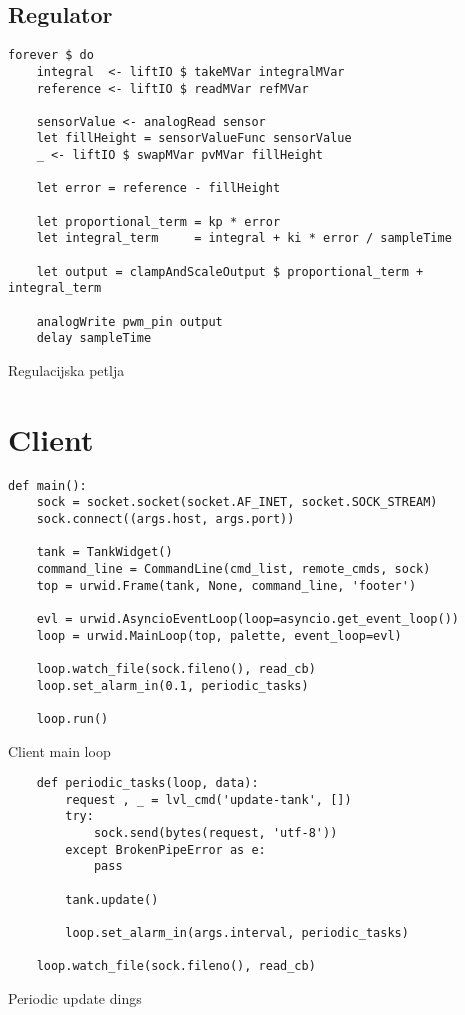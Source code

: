\subsection{Regulator}

\begin{listing}[H]
\centering
\begin{verbatim}
forever $ do
    integral  <- liftIO $ takeMVar integralMVar
    reference <- liftIO $ readMVar refMVar

    sensorValue <- analogRead sensor
    let fillHeight = sensorValueFunc sensorValue
    _ <- liftIO $ swapMVar pvMVar fillHeight

    let error = reference - fillHeight

    let proportional_term = kp * error
    let integral_term     = integral + ki * error / sampleTime

    let output = clampAndScaleOutput $ proportional_term + integral_term

    analogWrite pwm_pin output
    delay sampleTime
\end{verbatim}
\caption{Regulacijska petlja}
\label{lst:regulator}
\end{listing}

\newpage
\section{Client}
\begin{listing}[H]
\centering
\begin{verbatim}
def main():
    sock = socket.socket(socket.AF_INET, socket.SOCK_STREAM)
    sock.connect((args.host, args.port))

    tank = TankWidget()
    command_line = CommandLine(cmd_list, remote_cmds, sock)
    top = urwid.Frame(tank, None, command_line, 'footer')

    evl = urwid.AsyncioEventLoop(loop=asyncio.get_event_loop())
    loop = urwid.MainLoop(top, palette, event_loop=evl)

    loop.watch_file(sock.fileno(), read_cb)
    loop.set_alarm_in(0.1, periodic_tasks)

    loop.run()
\end{verbatim}
\caption{Client main loop}
\label{lst:client main}
\end{listing}

\begin{listing}[H]
\centering
\begin{verbatim}
    def periodic_tasks(loop, data):
        request , _ = lvl_cmd('update-tank', [])
        try:
            sock.send(bytes(request, 'utf-8'))
        except BrokenPipeError as e:
            pass

        tank.update()

        loop.set_alarm_in(args.interval, periodic_tasks)

    loop.watch_file(sock.fileno(), read_cb)
\end{verbatim}
\caption{Periodic update dings}
\label{lst:periodic tasks}
\end{listing}


